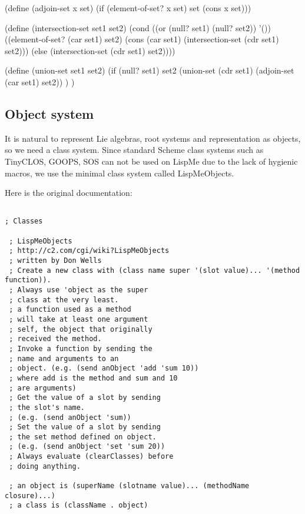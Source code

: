 \documentclass[a4paper,10pt]{article}%
\theoremstyle{definition} \newtheorem{Def}{Definition}
\begin{document}
(define (adjoin-set x set)
  (if (element-of-set? x set)
      set
      (cons x set)))

(define (intersection-set set1 set2)
  (cond ((or (null? set1) (null? set2)) '())
        ((element-of-set? (car set1) set2)        
         (cons (car set1)
               (intersection-set (cdr set1) set2)))
        (else (intersection-set (cdr set1) set2))))

(define (union-set set1 set2)
        (if (null? set1) set2
                (union-set (cdr set1)
                           (adjoin-set (car set1) set2))
        )
)

\nwendcode{}\nwdocspar

\subsection{Object system}
\label{sec:object-system}

It is natural to represent Lie algebras, root systems and representation as objects, so we need a class system. Since standard Scheme class systems such as TinyCLOS, GOOPS, SOS can not be used on LispMe due to the lack of hygienic macros, we use the minimal class system called LispMeObjects.

Here is the original documentation:
\begin{verbatim}
  
; Classes

 ; LispMeObjects
 ; http://c2.com/cgi/wiki?LispMeObjects
 ; written by Don Wells
 ; Create a new class with (class name super '(slot value)... '(method function)).
 ; Always use 'object as the super
 ; class at the very least.
 ; a function used as a method 
 ; will take at least one argument 
 ; self, the object that originally
 ; received the method.
 ; Invoke a function by sending the 
 ; name and arguments to an
 ; object. (e.g. (send anObject 'add 'sum 10))
 ; where add is the method and sum and 10
 ; are arguments)
 ; Get the value of a slot by sending
 ; the slot's name.
 ; (e.g. (send anObject 'sum))
 ; Set the value of a slot by sending
 ; the set method defined on object.
 ; (e.g. (send anObject 'set 'sum 20))
 ; Always evaluate (clearClasses) before
 ; doing anything.

 ; an object is (superName (slotname value)... (methodName closure)...)
 ; a class is (className . object)

\end{verbatim}
\end{document}
